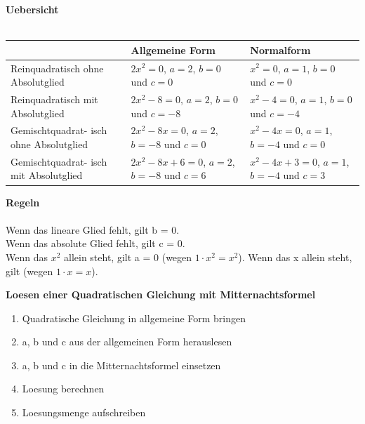 \begin{multicols}{2}
    \textbf{Uebersicht}\\~\\
    \begin{tabularx}{0.5\textwidth} {
            | >{\raggedright\arraybackslash}X
            | >{\raggedright\arraybackslash}X
            | >{\raggedright\arraybackslash}X |}
        \hline
        \textbf{}                               & \textbf{Allgemeine Form}                       & \textbf{Normalform}                           \\ \hline
        Reinquadratisch ohne Absolutglied       & $2x^2 = 0$, $a = 2$, $b = 0$ und $c = 0$       & $x^2 = 0$, $a = 1$, $b = 0$ und $c = 0$       \\\hline
        Reinquadratisch mit Absolutglied        & $2x^2 -8 = 0$, $a = 2$, $b = 0$ und $c = -8$   & $x^2-4 = 0$, $a = 1$, $b = 0$ und $c = -4$    \\ \hline
        Gemischtquadrat- isch ohne Absolutglied & $2x^2-8x = 0$, $a = 2$, $b = -8$ und $c = 0$   & $x^2 -4x= 0$,  $a = 1$, $b = -4$ und $c = 0$  \\ \hline
        Gemischtquadrat- isch mit Absolutglied  & $2x^2-8x+6 = 0$, $a = 2$, $b = -8$ und $c = 6$ & $x^2-4x+3 = 0$, $a = 1$, $b = -4$ und $c = 3$ \\ \hline
    \end{tabularx}

    \textbf{Regeln}\\~\\
    Wenn das lineare Glied fehlt, gilt b = 0. \\
    Wenn das absolute Glied fehlt, gilt c = 0. \\
    Wenn das $x^2$ allein steht, gilt a = 0 (wegen $1 \cdot x^2 = x^2$).
    Wenn das x allein steht, gilt (wegen $1 \cdot x = x$).

    \textbf{Loesen einer Quadratischen Gleichung mit Mitternachtsformel}

    \begin{enumerate}
        \item Quadratische Gleichung in allgemeine Form bringen
        \item a, b und c aus der allgemeinen Form herauslesen
        \item  a, b und c in die Mitternachtsformel einsetzen
        \item Loesung berechnen
        \item Loesungsmenge aufschreiben
    \end{enumerate}


\end{multicols}
